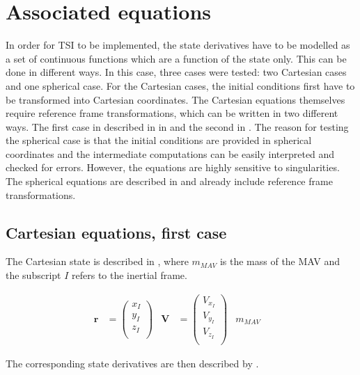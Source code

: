 \section{Associated equations}
\label{sec:assEq}
In order for \ac{TSI} to be implemented, the state derivatives have to be modelled as a set of continuous functions which are a function of the state only. This can be done in different ways. In this case, three cases were tested: two Cartesian cases and one spherical case. For the Cartesian cases, the initial conditions first have to be transformed into Cartesian coordinates. The Cartesian equations themselves require reference frame transformations, which can be written in two different ways. The first case in described in in  and the second in . The reason for testing the spherical case is that the initial conditions are provided in spherical coordinates and the intermediate computations can be easily interpreted and checked for errors. However, the equations are highly sensitive to singularities. The spherical equations are described in  and already include reference frame transformations. 

\subsection{Cartesian equations, first case}
\label{subsec:careq}
The Cartesian state is described in , where $m_{MAV}$ is the mass of the \ac{MAV} and the subscript $I$ refers to the inertial frame.

\begin{align} \label{eq:state}
\mathbf{r}&=\begin{pmatrix}
x_{I}\\
y_{I}\\
z_{I}\\
\end{pmatrix}
&
\mathbf{V}&=\begin{pmatrix}
V_{x_{I}} \\
V_{y_{I}} \\
V_{z_{I}}\\
\end{pmatrix}
&
m_{MAV}&
\end{align}


The corresponding state derivatives are then described by .

